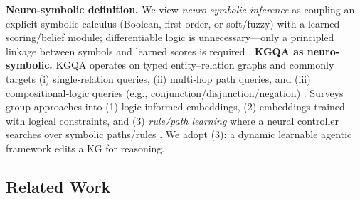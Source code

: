 \documentclass{article} %
\begin{document}
\textbf{Neuro-symbolic definition.} We view \emph{neuro-symbolic inference} as coupling an explicit symbolic calculus (Boolean, first‑order, or soft/fuzzy) with a learned scoring/belief module; differentiable logic is unnecessary—only a principled linkage between symbols and learned scores is required \citep{DeSmetDeRaedt2025}.
\textbf{KGQA as neuro-symbolic.} KGQA operates on typed entity–relation graphs and commonly targets (i) single‑relation queries, (ii) multi‑hop path queries, and (iii) compositional‑logic queries (e.g., conjunction/disjunction/negation) \citep{Zhang2021AIOpen}. Surveys group approaches into (1) logic‑informed embeddings, (2) embeddings trained with logical constraints, and (3) \emph{rule/path learning} where a neural controller searches over symbolic paths/rules \citep{DeLong2024NeSyKG}. We adopt (3): a dynamic learnable agentic framework edits a KG for reasoning.

\subsection{Related Work}
\end{document}

